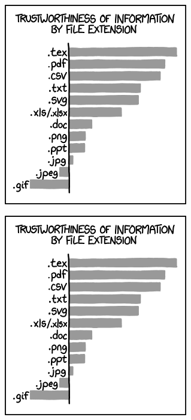 \documentclass[intlimits,twoside,a4paper,11pt]{article}
\begin{document}
\begin{figure}[H]
	\centering
	\begin{subfigure}[t]{70mm} %
		\includegraphics[width=\textwidth]{xkcd1301.png} %
		\label{fig-example-2a}
	\end{subfigure}
	\quad %
	\begin{subfigure}[t]{50mm}
		\includegraphics[width=\textwidth]{xkcd1301.png}

\end{subfigure}
\end{figure}
\end{document}
